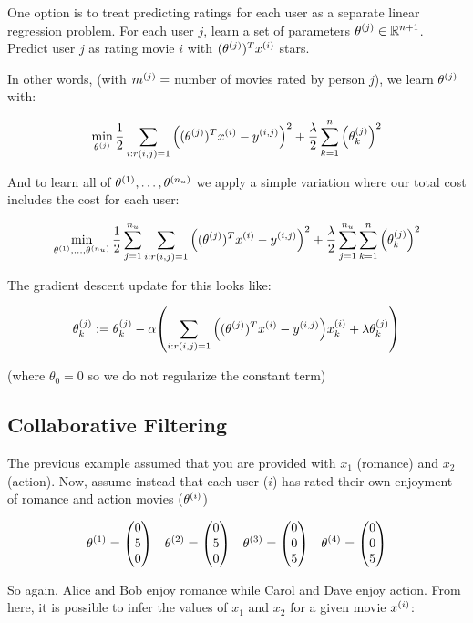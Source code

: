One option is to treat predicting ratings for each user as a separate linear regression problem.
For each user $j$, learn a set of parameters $\theta_{}^{(j)} \in \mathbb{R}^{n+1}$.
Predict user $j$ as rating movie $i$ with $(\theta_{}^{(j)})^T x_{}^{(i)}$ stars.

In other words, (with $m_{}^{(j)}=$ number of movies rated by person $j$), we learn $\theta_{}^{(j)}$ with:

\[
    \min_{\theta_{}^{(j)}}
    \frac{1}{2} \sum_{i:r(i,j)=1} \qty( (\theta_{}^{(j)})^T x_{}^{(i)} - y_{}^{(i,j)} )^2
    + \frac{\lambda}{2} \sum_{k=1}^n \qty( \theta_{k}^{(j)} )^2
\]

And to learn all of $\theta_{}^{(1)}, \dots, \theta_{}^{(n_u)}$ we apply a simple variation
where our total cost includes the cost for each user:

\[
    \min_{\theta_{}^{(1)}, \dots, \theta_{}^{(n_u)}}
    \frac{1}{2} \sum_{j=1}^{n_u} \sum_{i:r(i,j)=1} \qty( (\theta_{}^{(j)})^T x_{}^{(i)} - y_{}^{(i,j)} )^2
    + \frac{\lambda}{2} \sum_{j=1}^{n_u} \sum_{k=1}^n \qty( \theta_{k}^{(j)} )^2
\]

The gradient descent update for this looks like:

\[
    \theta_{k}^{(j)} := \theta_{k}^{(j)} - \alpha \qty(
        \sum_{i:r(i,j)=1} \qty( 
            (\theta_{}^{(j)})^T x_{}^{(i)} - y_{}^{(i,j)} 
        ) x_{k}^{(i)}
        + \lambda \theta_{k}^{(j)}
    )
\]

(where $\theta_0=0$ so we do not regularize the constant term)

\subsection{Collaborative Filtering}

The previous example assumed that you are provided with $x_1$ (romance) and $x_2$ (action).
Now, assume instead that each user ($i$) has rated their own enjoyment of romance and action movies ($\theta_{}^{(i)}$)

\[
    \theta\s{1} = \mqty(0\\5\\0) \quad
    \theta\s{2} = \mqty(0\\5\\0) \quad
    \theta\s{3} = \mqty(0\\0\\5) \quad
    \theta\s{4} = \mqty(0\\0\\5)
\]

So again, Alice and Bob enjoy romance while Carol and Dave enjoy action.
From here, it is possible to infer the values of $x_1$ and $x_2$ for a given movie $x_{}^{(i)}$:

